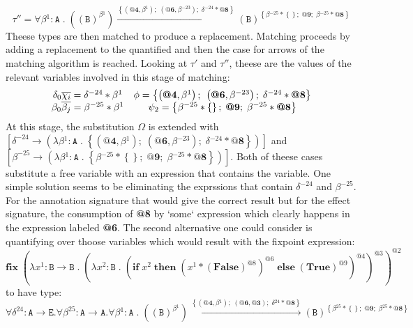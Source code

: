 \documentclass[8pt]{extarticle}
\begin{document}
\[
\tau'' = \forall{}\beta{}^{1}:\mathtt{A}\;{}.\;{}\left(\left(\mathtt{B}\right)^{\beta{}^{1}}\right)\xrightarrow{\left\{\left(\textbf{@4},\beta{}^{1}\right);\;{}\left(\textbf{@6},\beta{}^{-23}\right);\;{}\delta{}^{-24}*\textbf{@8}\right\}}\left(\mathtt{B}\right)^{\left\{\beta{}^{-25}*\left\{\right\};\;{}\textbf{@9};\;{}\beta{}^{-25}*\textbf{@8}\right\}}
\]
Theese types are then matched to produce a replacement. Matching proceeds by adding a replacement to the quantified and then the case for arrows of the matching algorithm is reached. Looking at $\tau'$ and $\tau''$, theese are the values of the relevant variables involved in this stage of matching:
\[
\begin{array}{c c}
\delta_0\overline{\chi_i}=\delta{}^{-24}*\beta{}^{1} & \phi = \left\{\left(\textbf{@4},\beta{}^{1}\right);\;{}\left(\textbf{@6},\beta{}^{-23}\right);\;{}\delta{}^{-24}*\textbf{@8}\right\} \\
\beta_0\overline{\beta_j}=\beta{}^{-25}*\beta{}^{1} & \psi_2=\left\{\beta{}^{-25}*\left\{\right\};\;{}\textbf{@9};\;{}\beta{}^{-25}*\textbf{@8}\right\}
\end{array}
\]
At this stage, the substitution $\Omega$ is extended with $\left[\delta^{-24}\to{}\left(\lambda{}\beta{}^{1}:\mathtt{A}\;{}.\;{}\left\{\left(\textbf{@4},\beta{}^{1}\right);\;{}\left(\textbf{@6},\beta{}^{-23}\right);\;{}\delta{}^{-24}*\textbf{@8}\right\}\right)\right]$ and\\ $\left[\beta^{-25}\to{}\left(\lambda{}\beta{}^{1}:\mathtt{A}\;{}.\;{}\left\{\beta{}^{-25}*\left\{\right\};\;{}\textbf{@9};\;{}\beta{}^{-25}*\textbf{@8}\right\}\right)\right]$. Both of theese cases substitute a free variable with an expression that contains the variable. One simple solution seems to be eliminating the exprssions that contain $\delta^{-24}$ and $\beta^{-25}$. For the annotation signature that would give the correct result but for the effect signature, the consumption of {\bf @8} by `some` expression which clearly happens in the expression labeled {\bf @6}. The second alternative one could consider is quantifying over thoose variables which would result with the fixpoint expression:
\[
\mathbf{fix}\;{}\left(\lambda{}x^{1}:\mathtt{B}\to{}\mathtt{B}\;{}.\;{}\left(\lambda{}x^{2}:\mathtt{B}\;{}.\;{}\left(\mathbf{if}\;{}x^{2}\;{}\mathbf{then}\;{}\left(x^{1}*\left(\mathbf{False}\right)^{\mathit{@8}}\right)^{\mathit{@6}}\;{}\mathbf{else}\;{}\left(\mathbf{True}\right)^{\mathit{@9}}\right)^{\mathit{@4}}\right)^{\mathit{@3}}\right)^{\mathit{@2}}
\]
to have type:
\[
\forall{}\delta^{24}:\mathtt{A}\to\mathtt{E}.\forall{}\beta^{25}:\mathtt{A}\to\mathtt{A}.\forall{}\beta{}^{1}:\mathtt{A}\;{}.\;{}\left(\left(\mathtt{B}\right)^{\beta{}^{1}}\right)\xrightarrow{\left\{\left(\textbf{@4},\beta{}^{1}\right);\;{}\left(\textbf{@6},\textbf{@3}\right);\;{}\delta{}^{24}*\textbf{@8}\right\}}\left(\mathtt{B}\right)^{\left\{\beta{}^{25}*\left\{\right\};\;{}\textbf{@9};\;{}\beta{}^{25}*\textbf{@8}\right\}}
\]
\end{document}
